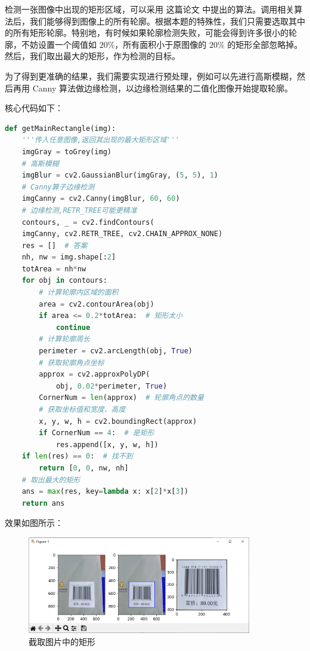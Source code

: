 \documentclass{ctexart}
\begin{document}
检测一张图像中出现的矩形区域，可以采用 这篇论文 中提出的算法。调用相关算法后，我们能够得到图像上的所有轮廓。根据本题的特殊性，我们只需要选取其中的所有矩形轮廓。特别地，有时候如果轮廓检测失败，可能会得到许多很小的轮廓，不妨设置一个阈值如 $20\%$，所有面积小于原图像的 $20\%$ 的矩形全部忽略掉。然后，我们取出最大的矩形，作为检测的目标。

为了得到更准确的结果，我们需要实现进行预处理，例如可以先进行高斯模糊，然后再用 Canny 算法做边缘检测，以边缘检测结果的二值化图像开始提取轮廓。

核心代码如下：

\begin{lstlisting}[language=python]
def getMainRectangle(img):
    '''传入任意图像,返回其出现的最大矩形区域'''
    imgGray = toGrey(img)
    # 高斯模糊
    imgBlur = cv2.GaussianBlur(imgGray, (5, 5), 1)
    # Canny算子边缘检测
    imgCanny = cv2.Canny(imgBlur, 60, 60)
    # 边缘检测,RETR_TREE可能更精准
    contours, _ = cv2.findContours(
    imgCanny, cv2.RETR_TREE, cv2.CHAIN_APPROX_NONE)
    res = []  # 答案
    nh, nw = img.shape[:2]
    totArea = nh*nw
    for obj in contours:
        # 计算轮廓内区域的面积
        area = cv2.contourArea(obj)
        if area <= 0.2*totArea:  # 矩形太小
            continue
        # 计算轮廓周长
        perimeter = cv2.arcLength(obj, True)
        # 获取轮廓角点坐标
        approx = cv2.approxPolyDP(
            obj, 0.02*perimeter, True)
        CornerNum = len(approx)  # 轮廓角点的数量
        # 获取坐标值和宽度、高度
        x, y, w, h = cv2.boundingRect(approx)
        if CornerNum == 4:  # 是矩形
            res.append([x, y, w, h])
    if len(res) == 0:  # 找不到
        return [0, 0, nw, nh]
    # 取出最大的矩形
    ans = max(res, key=lambda x: x[2]*x[3])  
    return ans
\end{lstlisting}

效果如图所示：

\begin{figure}[H]
    \centering
    \includegraphics[height=120pt]{sample_graphSplit}
    \caption{截取图片中的矩形}
\end{figure}
\end{document}
